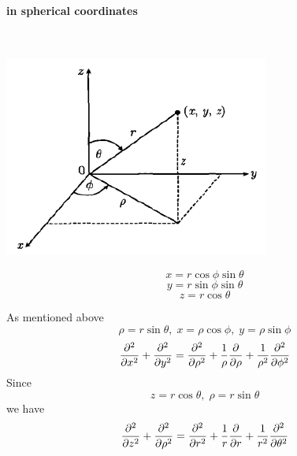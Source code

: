 \documentclass[UTF8]{ctexart} %
\numberwithin{equation}{section}
\begin{document}
\paragraph{in spherical coordinates}
~\\
\begin{minipage}[H]{0.4\linewidth}
	\includegraphics[width=\linewidth]{1.png}
\end{minipage}
\begin{minipage}[H]{0.6\linewidth}
	\begin{equation}\label{key}
	x=r\cos\phi\sin\theta
	\end{equation}
	\begin{equation}\label{key}
	y=r\sin\phi\sin\theta
	\end{equation}
	\begin{equation}\label{key}
	z=r\cos\theta
	\end{equation}
\end{minipage}
As mentioned above
\begin{equation}\label{key}
\rho=r\sin\theta,\;x=\rho\cos\phi,\;y=\rho\sin\phi
\end{equation}
\begin{equation}\label{1}
\pdv[2]{x}+\pdv[2]{y}=\pdv[2]{\rho}+\dfrac{1}{\rho}\pdv{\rho}+\dfrac{1}{\rho^2}\pdv[2]{\phi}
\end{equation}
Since
\begin{equation}\label{key}
z=r\cos\theta,\;\rho=r\sin\theta
\end{equation}
we have
\begin{equation}\label{2}
\pdv[2]{z}+\pdv[2]{\rho}=\pdv[2]{r}+\dfrac{1}{r}\pdv{r}+\dfrac{1}{r^2}\pdv[2]{\theta}
\end{equation}
\end{document}
